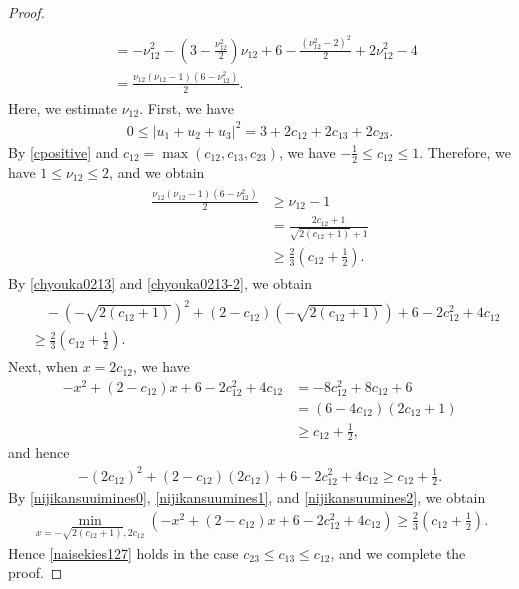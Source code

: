 \documentclass[reqno]{amsart}
\theoremstyle{plain}
\theoremstyle{definition}
\numberwithin{equation}{section}
\newcommand{\1}{\mathbbm{1}}
\begin{document}
\begin{proof}
\begin{align}
\begin{aligned}
 \\
 &=-\nu_{12}^2-\left(3-\frac{\nu_{12}^2}{2}\right)\nu_{12}+6-\frac{(\nu_{12}^2-2)^2}{2}+2\nu_{12}^2-4
 \\
 &=\frac{\nu_{12}(\nu_{12}-1)(6-\nu_{12}^2)}{2}.
 \end{aligned}
 \end{align}
Here, we estimate $\nu_{12}$. First, we have
 \begin{align}\label{cpositive}
0\leq  \left|u_1+u_2+u_3\right|^2=3+2c_{12}+2c_{13}+2c_{23}.
\end{align}
By \eqref{cpositive} and $c_{12}=\max{(c_{12},c_{13},c_{23})}$, we have $-\frac{1}{2}\leq c_{12}\leq 1$. Therefore, we have $1\leq \nu_{12}\leq 2$, and we obtain
 \begin{align}\label{chyouka0213-2}
 \begin{aligned}
\frac{\nu_{12}(\nu_{12}-1)(6-\nu_{12}^2)}{2}&\geq \nu_{12}-1
 \\
 &=\frac{2c_{12}+1}{\sqrt{2(c_{12}+1)}+1}
 \\
 &\geq \frac{2}{3}\left(c_{12}+\frac{1}{2}\right).
 \end{aligned}
 \end{align}
By \eqref{chyouka0213} and \eqref{chyouka0213-2}, we obtain
 \begin{align}\label{nijikansuumines1}
 \begin{aligned}
&\quad -\left(-\sqrt{2(c_{12}+1)}\right)^2+(2-c_{12})\left(-\sqrt{2(c_{12}+1)}\right)+6-2c_{12}^2+4c_{12}
\\
&\geq \frac{2}{3}\left(c_{12}+\frac{1}{2}\right).
 \end{aligned}
 \end{align}
Next, when $x=2c_{12}$, we have
\begin{align*}
-x^2+(2-c_{12})x+6-2c_{12}^2+4c_{12}&=-8c_{12}^2+8c_{12}+6
 \\
 &=(6-4c_{12})(2c_{12}+1)
 \\
 &\geq c_{12}+\frac{1}{2},
 \end{align*}
 and hence
 \begin{align}\label{nijikansuumines2}
 -\left(2c_{12}\right)^2+(2-c_{12})\left(2c_{12}\right)+6-2c_{12}^2+4c_{12}\geq c_{12}+\frac{1}{2}.
 \end{align}
 By \eqref{nijikansuuimines0}, \eqref{nijikansuumines1}, and \eqref{nijikansuumines2}, we obtain 
 \begin{align*}
\min_{x=-\sqrt{2(c_{12}+1)},2c_{12}}\left(-x^2+(2-c_{12})x+6-2c_{12}^2+4c_{12}\right)\geq \frac{2}{3}\left(c_{12}+\frac{1}{2}\right).
 \end{align*}
Hence \eqref{naisekies127} holds in the case $c_{23}\leq c_{13}\leq c_{12}$, and we complete the proof.
\end{proof}
\end{document}
